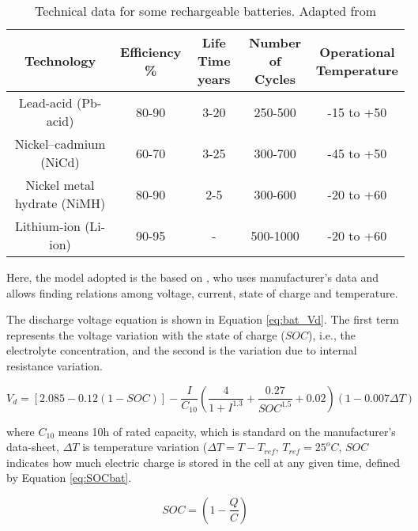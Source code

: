 \begin{table}[!t]
\renewcommand{\arraystretch}{1.3}
\caption{Technical data for some rechargeable batteries. Adapted from \cite{Pinho}}
\label{table:batteries}
\centering
\begin{tabular}{c | c | c | c | c }
\hline
\hline
Technology & \makecell{Efficiency \\ \%} & \makecell{Life Time \\ years} & \makecell{Number of \\ Cycles} & \makecell{Operational \\ Temperature}\\
\hline
Lead-acid (Pb-acid) & 80-90 & 3-20 & 250-500 & -15 to +50 \\
\hline
Nickel–cadmium (NiCd) & 60-70 & 3-25 & 300-700 & -45 to +50 \\
\hline
Nickel metal hydrate (NiMH) & 80-90 & 2-5 & 300-600 & -20 to +60 \\
\hline
Lithium-ion (Li-ion) & 90-95 & - & 500-1000 & -20 to +60 \\
\hline
\hline
\end{tabular}
\end{table}

Here, the model adopted is the based on \cite{Copetti}, who uses manufacturer's data and allows finding relations among voltage, current, state of charge and temperature. 

The discharge voltage equation is shown in Equation \ref{eq:bat_Vd}. The first term represents the voltage variation with the state of charge ($ SOC $), i.e., the electrolyte concentration, and the second is the variation due to internal resistance variation.

\begin{equation}
\label{eq:bat_Vd}
V_{d} = \left[ 2.085-0.12(1-SOC) \right] - \dfrac{I}{C_{10}} \left( \dfrac{4}{1+I^{1.3}} + \dfrac{0.27}{SOC^{1.5}}+0.02 \right) (1-0.007 \Delta T)
\end{equation}

\noindent where $ C_{10} $ means 10h of rated capacity, which is standard on the manufacturer's data-sheet, $ \Delta T $ is temperature variation ($ \Delta T=T-T_{ref} $, $ T_{ref}=25^{o}C $, $ SOC $ indicates how much electric charge is stored in the cell at any given time, defined by Equation \ref{eq:SOCbat}.

\begin{equation}
\label{eq:SOCbat}
SOC = \left( 1 - \dfrac{Q}{C} \right) 
\end{equation}

